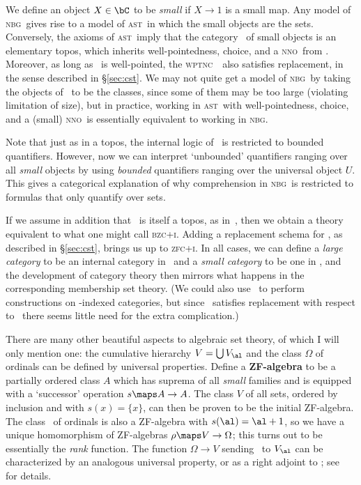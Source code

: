 \documentclass[12pt]{amsart}
\def\zfci{\textsc{zfc+i}}
\def\zfcs{\textsc{zfc/s}}
\def\zmcs{\textsc{zmc/s}}
\def\nbg{\textsc{nbg}}
\def\wptnc{\textsc{wptnc}}
\def\bzci{\textsc{bzc+i}}
\def\nno{\textsc{nno}}
\def\ast{\textsc{ast}}
\begin{document}
We define an object $X\in\bC$ to be \emph{small} if $X\to 1$ is a
small map.  Any model of \nbg\ gives rise to a model of \ast\ in which
the small objects are the sets.  Conversely, the axioms of \ast\ imply
that the category \bS\ of small objects is an elementary topos, which
inherits well-pointedness, choice, and a \nno\ from \bC.  Moreover, as
long as \bC\ is well-pointed, the \wptnc\ \bS\ also satisfies
replacement, in the sense described in \S\ref{sec:cst}.  We may not
quite get a model of \nbg\ by taking the objects of \bC\ to be the
classes, since some of them may be too large (violating limitation of
size), but in practice, working in \ast\ with well-pointedness,
choice, and a (small) \nno\ is essentially equivalent to working in
\nbg.

Note that just as in a topos, the internal logic of \bC\ is restricted
to bounded quantifiers.  However, now we can interpret `unbounded'
quantifiers ranging over all \emph{small} objects by using
\emph{bounded} quantifiers ranging over the universal object $U$.
This gives a categorical explanation of why comprehension in \nbg\ is
restricted to formulas that only quantify over sets.

If we assume in addition that \bC\ is itself a topos, as
in~\cite{streicher:universes}, then we obtain a theory equivalent to
what one might call \bzci.  Adding a replacement schema for \bC, as
described in \S\ref{sec:cst}, brings us up to \zfci.  In all cases, we
can define a \emph{large category} to be an internal category in \bC\
and a \emph{small category} to be one in \bS, and the development of
category theory then mirrors what happens in the corresponding
membership set theory.  (We could also use \bC\ to perform
constructions on \bS-indexed categories, but since \bS\ satisfies
replacement with respect to \bC\ there seems little need for the extra
complication.)


There are many other beautiful aspects to algebraic set theory, of
which I will only mention one: the cumulative hierarchy $V=\bigcup
V_\al$ and the class $\Omega$ of ordinals can be defined by universal
properties.  Define a \textbf{ZF-algebra} to be a partially ordered
class $A$ which has suprema of all \emph{small} families and is
equipped with a `successor' operation $s\maps A\to A$.  The class $V$
of all sets, ordered by inclusion and with $s(x) = \{x\}$, can then be
proven to be the initial ZF-algebra.  The class \Omega\ of ordinals is
also a ZF-algebra with $s(\al) = \al+1$, so we have a unique
homomorphism of ZF-algebras $\rho\maps V\to\Omega$; this turns out to
be essentially the \emph{rank} function.  The function $\Omega\to V$
sending \al\ to $V_\al$ can be characterized by an analogous universal
property, or as a right adjoint to \rho; see~\cite{jm:ast} for
details.
\end{document}
